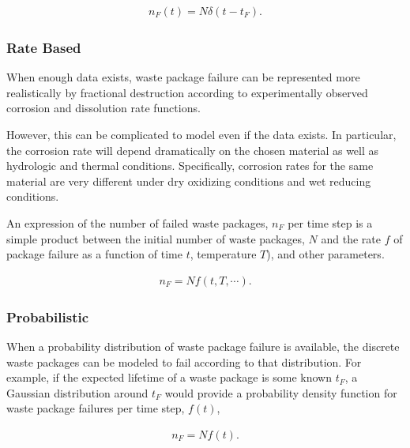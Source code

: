 \begin{align}
  n_F(t) = N\delta(t-t_F).
  \label{instantaneous}
\end{align}

\subsubsection{Rate Based} 

When enough data exists, waste package failure can
be represented more  realistically by fractional destruction according to
experimentally observed corrosion and dissolution rate functions.

However, this can be complicated to model even if the data exists. In
particular, the corrosion rate will depend dramatically on the chosen material 
as well as hydrologic and
thermal conditions. Specifically, corrosion rates for the same material are
very different under dry oxidizing conditions and wet reducing conditions. 


An expression of the number of failed waste packages, $n_F$ per time step is a simple 
product between the initial number of waste packages, $N$ and the rate $f$ of
package  failure as a function of time $t$, temperature $T$), and other 
parameters.

\begin{align}
  n_F = Nf(t,T,\cdots).
  \label{rate}
\end{align}

\subsubsection{Probabilistic}

When a probability distribution of waste package failure is available, the 
discrete waste packages can be modeled to fail according to that distribution. 
For example, if the expected lifetime of a waste package is some known $t_F$, a 
Gaussian distribution around $t_F$ would provide a probability density function 
for waste package failures per time step, $f(t)$,

\begin{align}
  n_F=Nf(t).
  \label{probabilistic}
\end{align}


